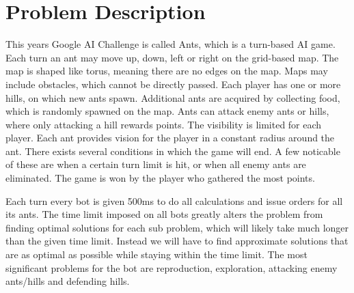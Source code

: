 \section{Problem Description}
This years Google AI Challenge is called Ants, which is a turn-based AI game. Each turn an ant may move up, down, left or right on the grid-based map. The map is shaped like torus, meaning there are no edges on the map. Maps may include obstacles, which cannot be directly passed. Each player has one or more hills, on which new ants spawn. Additional ants are acquired by collecting food, which is randomly spawned on the map. Ants can attack enemy ants or hills, where only attacking a hill rewards points. The visibility is limited for each player. Each ant provides vision for the player in a constant radius around the ant. There exists several conditions in which the game will end. A few noticable of these are when a certain turn limit is hit, or when all enemy ants are eliminated. The game is won by the player who gathered the most points.

Each turn every bot is given 500ms to do all calculations and issue orders for all its ants. The time limit imposed on all bots greatly alters the problem from finding optimal solutions for each sub problem, which will likely take much longer than the given time limit. Instead we will have to find approximate solutions that are as optimal as possible while staying within the time limit. The most significant problems for the bot are reproduction, exploration, attacking enemy ants/hills and defending hills.
